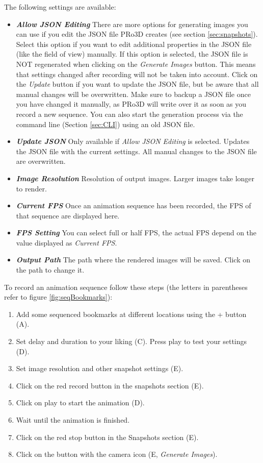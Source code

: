 The following settings are available:
\begin{itemize}
	\item \textbf{\emph{Allow JSON Editing}} There are more options for generating images you can use if you edit the JSON file PRo3D creates (see section \ref{sec:snapshots}). Select this option if you want to edit additional properties in the JSON file (like the field of view) manually. If this option is selected, the JSON file is NOT regenerated when clicking on the \emph{Generate Images} button. This means that settings changed after recording will not be taken into account. Click on the \emph{Update} button if you want to update the JSON file, but be aware that all manual changes will be overwritten. Make sure to backup a JSON file once you have changed it manually, as PRo3D will write over it as soon as you record a new sequence. You can also start the generation process via the command line (Section \ref{sec:CLI}) using an old JSON file. 
	\item \textbf{\emph{Update JSON}} Only available if \emph{Allow JSON Editing} is selected. Updates the JSON file with the current settings. All manual changes to the JSON file are overwritten. 
	\item \textbf{\emph{Image Resolution}} Resolution of output images. Larger images take longer to render.
	\item \textbf{\emph{Current FPS}} Once an animation sequence has been recorded, the FPS of that sequence are displayed here.
	\item \textbf{\emph{FPS Setting}} You can select full or half FPS, the actual FPS depend on the value displayed as \emph{Current FPS}. 
	\item \textbf{\emph{Output Path}} The path where the rendered images will be saved. Click on the path to change it.
\end{itemize}

To record an animation sequence follow these steps (the letters in parentheses refer to figure \ref{fig:seqBookmarks}):

\begin{enumerate}
	\item Add some sequenced bookmarks at different locations using the + button (A).
	\item Set delay and duration to your liking (C). Press play to test your settings (D).
	\item Set image resolution and other snapshot settings (E).
	\item Click on the red record button in the snapshots section (E).
	\item Click on play to start the animation (D).
	\item Wait until the animation is finished.
	\item Click on the red stop button in the Snapshots section (E).
	\item Click on the button with the camera icon (E, \emph{Generate Images}).
\end{enumerate}
